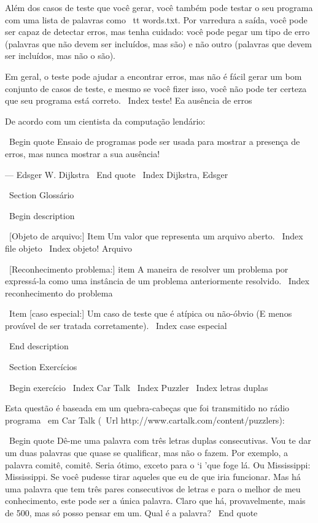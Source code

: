\documentclass[10pt]{book}
\begin{document}
\begin {itemize}
{{{{{{Além dos casos de teste que você gerar, você também pode testar
o seu programa com uma lista de palavras como {\ tt words.txt}. Por varredura
a saída, você pode ser capaz de detectar erros, mas tenha cuidado:
você pode pegar um tipo de erro (palavras que não devem ser
incluídos, mas são) e não outro (palavras que devem ser incluídos,
mas não o são).

Em geral, o teste pode ajudar a encontrar erros, mas não é fácil
gerar um bom conjunto de casos de teste, e mesmo se você fizer isso, você não pode
ter certeza que seu programa está correto.
\ Index {teste! Ea ausência de erros}

De acordo com um cientista da computação lendário:

\ Begin {quote}
Ensaio de programas pode ser usada para mostrar a presença de erros, mas nunca
mostrar a sua ausência!

--- Edsger W. Dijkstra
\ End {quote}
\ Index {Dijkstra, Edsger}


\ Section {} Glossário

\ Begin {description}

\ [Objeto de arquivo:] Item Um valor que representa um arquivo aberto.
\ Index {file objeto}
\ Index {objeto! Arquivo}

\ [Reconhecimento problema:] item A maneira de resolver um problema por
expressá-la como uma instância de um problema anteriormente resolvido.
\ Index {reconhecimento do problema}

\ Item [caso especial:] Um caso de teste que é atípica ou não-óbvio
(E menos provável de ser tratada corretamente).
\ Index {case especial}

\ End {description}


\ Section {Exercícios}

\ Begin {} exercício
\ Index {Car Talk}
\ Index {} Puzzler
\ Index {letras duplas}

Esta questão é baseada em um quebra-cabeças que foi transmitido no rádio
programa {\ em Car Talk} 
(\ Url {http://www.cartalk.com/content/puzzlers}):

\ Begin {quote}
Dê-me uma palavra com três letras duplas consecutivas. Vou te dar um
duas palavras que quase se qualificar, mas não o fazem. Por exemplo, a palavra
comitê, comitê. Seria ótimo, exceto para o `i 'que
foge lá. Ou Mississippi: Mississippi. Se você pudesse
tirar aqueles que eu de que iria funcionar. Mas há uma palavra que tem três
pares consecutivos de letras e para o melhor de meu conhecimento, este pode
ser a única palavra. Claro que há, provavelmente, mais de 500, mas só posso
pensar em um. Qual é a palavra?
\ End {quote}

}}}}}}
\end{itemize}
\end{document}
